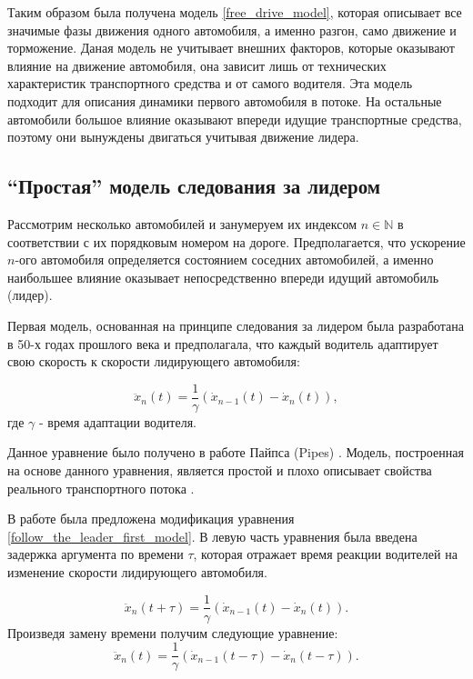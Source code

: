 \documentclass[12pt, a4paper]{extarticle}
\numberwithin{equation}{section}
\begin{document}
Таким образом была получена модель \eqref{free_drive_model}, которая описывает все значимые фазы движения одного автомобиля, а именно разгон, само движение и торможение. Даная модель не учитывает внешних факторов, которые оказывают влияние на движение автомобиля, она зависит лишь от технических характеристик транспортного средства и от самого водителя. Эта модель подходит для описания динамики первого автомобиля в потоке. На остальные автомобили большое влияние оказывают впереди идущие транспортные средства, поэтому они вынуждены двигаться учитывая движение лидера.

\subsection{``Простая'' модель следования за лидером}

Рассмотрим несколько автомобилей и занумеруем их индексом $n \in \mathbb{N}$ в соответствии с их порядковым номером на дороге. Предполагается, что ускорение $n$-ого автомобиля определяется состоянием соседних автомобилей, а именно наибольшее влияние оказывает непосредственно впереди идущий автомобиль (лидер).

Первая модель, основанная на принципе следования за лидером была разработана в 50-х годах прошлого века и предполагала, что каждый водитель адаптирует свою скорость к скорости лидирующего автомобиля:

\begin{equation} \label{follow_the_leader_first_model}
\ddot{x}_n(t) = \dfrac{1}{\gamma} (\dot{x}_{n-1}(t) - \dot{x}_{n}(t)), 
\end{equation}
где $\gamma$ - время адаптации водителя.

Данное уравнение было получено в работе Пайпса (Pipes) \cite{FirstFollowTheLeaderModel}. Модель, построенная на основе данного уравнения, является простой и плохо описывает свойства реального транспортного потока \cite{Shvetsov}.

В работе \cite{RefineFirstFollowTheLeaderModel} была предложена модификация уравнения \eqref{follow_the_leader_first_model}. В левую часть уравнения была введена задержка аргумента по времени $\tau$, которая отражает время реакции водителей на изменение скорости лидирующего автомобиля. 

\begin{equation*}
\ddot{x}_n(t+\tau) = \dfrac{1}{\gamma} (\dot{x}_{n-1}(t) - \dot{x}_{n}(t)).
\end{equation*}
Произведя замену времени получим следующие уравнение:
\begin{equation} \label{follow_the_leader_with_two_delay}
\ddot{x}_n(t) = \dfrac{1}{\gamma} (\dot{x}_{n-1}(t-\tau) - \dot{x}_{n}(t-\tau)).
\end{equation}
\end{document}
